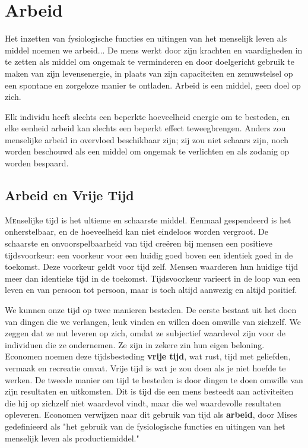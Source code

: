\chapter{Arbeid}
\begin{blockquotebox}
    Het inzetten van fysiologische functies en uitingen van het menselijk leven als middel noemen we arbeid... De mens werkt door zijn krachten en vaardigheden in te zetten als middel om ongemak te verminderen en door doelgericht gebruik te maken van zijn levensenergie, in plaats van zijn capaciteiten en zenuwstelsel op een spontane en zorgeloze manier te ontladen. Arbeid is een middel, geen doel op zich.

    \noindent Elk individu heeft slechts een beperkte hoeveelheid energie om te besteden, en elke eenheid arbeid kan slechts een beperkt effect teweegbrengen. Anders zou menselijke arbeid in overvloed beschikbaar zijn; zij zou niet schaars zijn, noch worden beschouwd als een middel om ongemak te verlichten en als zodanig op worden bespaard.\footnotemark
\end{blockquotebox}

\section{Arbeid en Vrije Tijd}

\lettrine{M}enselijke tijd is het ultieme en schaarste middel. Eenmaal gespendeerd
is het onherstelbaar, en de hoeveelheid kan niet eindeloos worden
vergroot. De schaarste en onvoorspelbaarheid van tijd creëren bij mensen
een positieve tijdsvoorkeur: een voorkeur voor een huidig goed boven een
identiek goed in de toekomst. Deze voorkeur geldt voor tijd zelf. Mensen
waarderen hun huidige tijd meer dan identieke tijd in de toekomst.
Tijdsvoorkeur varieert in de loop van een leven en van persoon tot
persoon, maar is toch altijd aanwezig en altijd positief.

We kunnen onze tijd op twee manieren besteden. De eerste bestaat uit het
doen van dingen die we verlangen, leuk vinden en willen doen omwille van
zichzelf. We zeggen dat ze nut leveren op zich, omdat ze subjectief
waardevol zijn voor de individuen die ze ondernemen. Ze zijn in zekere
zin hun eigen beloning. Economen noemen deze tijdsbesteding
\textbf{vrije tijd}, wat rust, tijd met geliefden, vermaak en recreatie
omvat. Vrije tijd is wat je zou doen als je niet hoefde te werken. De
tweede manier om tijd te besteden is door dingen te doen omwille van
zijn resultaten en uitkomsten. Dit is tijd die een mens besteedt aan
activiteiten die hij op zichzelf niet waardevol vindt, maar die wel
waardevolle resultaten opleveren. Economen verwijzen naar dit gebruik
van tijd als \textbf{arbeid}, door Mises gedefinieerd als "het gebruik
van de fysiologische functies en uitingen van het menselijk leven als
productiemiddel."\autocite{38}

